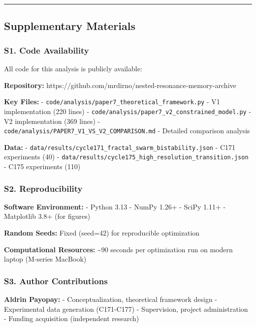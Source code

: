 \documentclass[
]{article}
\begin{document}
\begin{center}\rule{0.5\linewidth}{0.5pt}\end{center}

\subsection{Supplementary Materials}\label{supplementary-materials}

\subsubsection{S1. Code Availability}\label{s1.-code-availability}

All code for this analysis is publicly available:

\textbf{Repository:}
https://github.com/mrdirno/nested-resonance-memory-archive

\textbf{Key Files:} -
\texttt{code/analysis/paper7\_theoretical\_framework.py} - V1
implementation (220 lines) -
\texttt{code/analysis/paper7\_v2\_constrained\_model.py} - V2
implementation (369 lines) -
\texttt{code/analysis/PAPER7\_V1\_VS\_V2\_COMPARISON.md} - Detailed
comparison analysis

\textbf{Data:} -
\texttt{data/results/cycle171\_fractal\_swarm\_bistability.json} - C171
experiments (40) -
\texttt{data/results/cycle175\_high\_resolution\_transition.json} - C175
experiments (110)

\subsubsection{S2. Reproducibility}\label{s2.-reproducibility}

\textbf{Software Environment:} - Python 3.13 - NumPy 1.26+ - SciPy 1.11+
- Matplotlib 3.8+ (for figures)

\textbf{Random Seeds:} Fixed (seed=42) for reproducible optimization

\textbf{Computational Resources:} \textasciitilde90 seconds per
optimization run on modern laptop (M-series MacBook)

\subsubsection{S3. Author Contributions}\label{s3.-author-contributions}

\textbf{Aldrin Payopay:} - Conceptualization, theoretical framework
design - Experimental data generation (C171-C177) - Supervision, project
administration - Funding acquisition (independent research)
\end{document}
